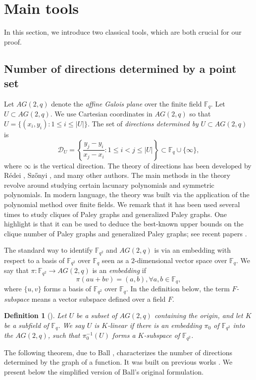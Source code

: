\documentclass[12pt,reqno]{amsart}
\newtheorem{defn}[thm]{Definition}
\theoremstyle{definition}
\newcommand{\F}{\mathbb{F}}
\begin{document}
\section{Main tools}\label{sect:tools}

In this section, we introduce two classical tools, which are both crucial for our proof.

\subsection{Number of directions determined by a point set}
Let $AG(2,q)$ denote the {\em affine Galois plane} over the finite field $\F_q$. Let $U \subset AG(2,q)$. We use Cartesian coordinates in $AG(2,q)$ so that $U=\{(x_i,y_i):1 \leq i \leq |U|\}$.
The set of {\em directions determined by} $U \subset AG(2, q)$ is 
\[ \mathcal{D}_U=\left\{ \frac{y_j-y_i}{x_j-x_i} \colon 1\leq i <j \leq |U| \right \} \subset \F_q \cup \{\infty\},\]
where $\infty$ is the vertical direction. The theory of directions has been developed by R\'edei \cite{LR73}, Sz\H{o}nyi \cite{Sz}, and many other authors. The main methods in the theory revolve around studying certain lacunary polynomials and symmetric polynomials. In modern language, the theory was built via the application of the polynomial method over finite fields. We remark that it has been used several times to study cliques of Paley graphs and generalized Paley graphs. One highlight is that it can be used to deduce the best-known upper bounds on the clique number of Paley graphs and generalized Paley graphs; see recent papers \cites{DSW,Yip2}.

The standard way to identify $\F_{q^2}$ and $AG(2,q)$ is via an embedding with respect to a basis of $\F_{q^2}$ over $\F_q$ seen as a $2$-dimensional vector space over $\F_q$. We say that $\pi:\F_{q^2}\to AG(2,q)$ is an {\em embedding} if
\[
\pi(au+bv)=(a,b), \forall a,b \in \F_q,
\]
where $\{u,v\}$ forms a basis of $\F_{q^2}$ over $\F_q$. In the definition below, the term \textit{$F$-subspace} means a vector subspace defined over a field $F$.

\begin{defn}[\cite{BBBSS}]
Let $U$ be a subset of $AG(2,q)$ containing the origin, and let $K$ be a subfield of $\F_q$. We say $U$ is $K$-linear if there is an embedding $\pi_0$ of $\F_{q^2}$ into the $AG(2,q)$, such that $\pi_0^{-1}(U)$ forms a $K$-subspace of $\F_{q^2}$.
\end{defn}

The following theorem, due to Ball \cite{Ball03}, characterizes the number of directions determined by the graph of a function. It was built on previous works \cites{LR73,BBS,BBBSS}. We present below the simplified version of Ball's original formulation.
\end{document}
